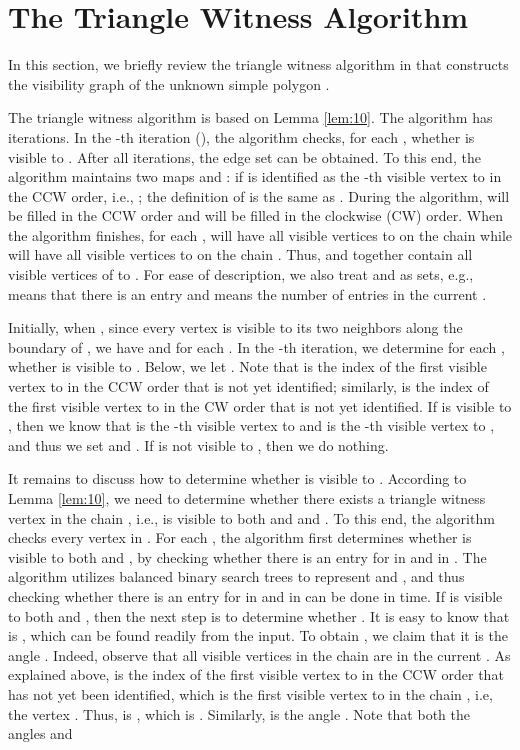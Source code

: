 \documentclass[11pt]{article}
\def\sectionspace{\vspace*{0in}}
\begin{document}
\sectionspace
\section{The Triangle Witness Algorithm}
\label{sec:review}
In this section, we briefly review the triangle witness algorithm in \cite{ref:DisserRe10} that
constructs the visibility graph  of the unknown simple polygon . 

The triangle witness algorithm is based on Lemma \ref{lem:10}. The
algorithm has  iterations. In the -th iteration
(),
the algorithm checks, for each , whether  is
visible to . After all iterations, the edge set  
 can be obtained. To this end, the algorithm maintains two maps 
and :  if  is identified as 
the -th visible vertex to  
in the CCW order, i.e., ; the definition of  is
the same as . During the algorithm,  will be filled in the CCW
order and  will be filled in the clockwise (CW) order. When the algorithm 
finishes, for each ,  will have all visible vertices to  on
the chain  while  will have
all visible vertices to  on the chain . Thus,  and  together contain all visible
vertices of  to . 
For ease of description, we also treat  and
 as sets, e.g.,  means that there is an entry
 and  means the number of entries in the
current .  

Initially, when , since every
vertex is visible to its two neighbors along the boundary of , we have 
and  for each . In the -th
iteration, we determine for each , whether  is visible to
. Below, we let . 
Note that  is the index of the first visible
vertex to  in the CCW order that is not yet identified;
similarly,  is the index of the first
visible vertex to  in the CW order that is not yet
identified. If  is visible to , then we know that
 is the -th visible vertex to  and 
is the -th visible vertex to ,
and thus we set  and
. If  is not visible to
, then we do nothing. 

It remains to discuss how to determine whether  is visible to
. According to Lemma \ref{lem:10}, we need to determine
whether there exists a triangle witness vertex  in the chain 
, i.e.,  is visible to both  and  and 
. 
To this end, the algorithm checks every vertex  in
. For each , the algorithm first determines 
whether  is visible to both
 and , by checking whether there is an entry for  in 
and in . The algorithm utilizes balanced binary search trees
to represent  and , and thus checking whether there is an entry
for  in  and in  can be done in  time. If  is
visible to both  and , then the next step is to determine whether
. 
It is easy to know that  is 
, which can be found readily from the input.
To obtain , we claim that it is the angle
. Indeed, observe that all visible
vertices in the chain  are in the current
. As explained above,  is the index of the first visible  
vertex to  in the CCW order that has not yet been identified, which is
the first visible vertex to  in the chain , i.e, the
vertex . Thus,  is
, which is .
Similarly,  is the angle
. Note that both the angles
 and
\end{document}
